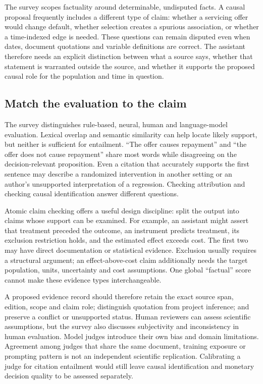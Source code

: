 The survey scopes factuality around determinable, undisputed facts. A causal
proposal frequently includes a different type of claim: whether a servicing
offer would change default, whether selection creates a spurious association,
or whether a time-indexed edge is needed. These questions can remain disputed
even when dates, document quotations and variable definitions are correct.
The assistant therefore needs an explicit distinction between what a source
says, whether that statement is warranted outside the source, and whether it
supports the proposed causal role for the population and time in question.

\subsection{Match the evaluation to the claim}

The survey distinguishes rule-based, neural, human and language-model
evaluation. Lexical overlap and semantic similarity can help locate likely
support, but neither is sufficient for entailment. ``The offer causes
repayment'' and ``the offer does not cause repayment'' share most words while
disagreeing on the decision-relevant proposition. Even a citation that
accurately supports the first sentence may describe a randomized intervention
in another setting or an author's unsupported interpretation of a regression.
Checking attribution and checking causal identification answer different
questions.

Atomic claim checking offers a useful design discipline: split the output into
claims whose support can be examined. For example, an assistant might assert
that treatment preceded the outcome, an instrument predicts treatment, its
exclusion restriction holds, and the estimated effect exceeds cost. The first
two may have direct documentation or statistical evidence. Exclusion usually
requires a structural argument; an effect-above-cost claim additionally needs
the target population, units, uncertainty and cost assumptions. One global
``factual'' score cannot make these evidence types interchangeable.

A proposed evidence record should therefore retain the exact source span,
edition, scope and claim role; distinguish quotation from project inference;
and preserve a conflict or unsupported status. Human reviewers can assess
scientific assumptions, but the survey also discusses subjectivity and
inconsistency in human evaluation. Model judges introduce their own bias and
domain limitations. Agreement among judges that share the same document,
training exposure or prompting pattern is not an independent scientific
replication. Calibrating a judge for citation entailment would still leave
causal identification and monetary decision quality to be assessed separately.

